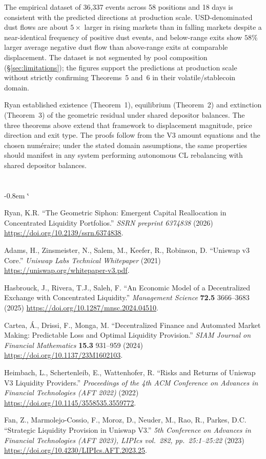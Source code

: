 \documentclass[11pt,a4paper]{article}
\makeatletter
\renewenvironment{thebibliography}[1]
  {\section*{\refname}%
   \fontsize{10pt}{12pt}\selectfont
   \list{\@biblabel{\@arabic\c@enumiv}}%
        {\settowidth\labelwidth{\@biblabel{#1}}%
         \leftmargin\labelwidth
         \advance\leftmargin-0.8em
         \advance\leftmargin\labelsep
         \setlength\itemindent{1em}%
         \setlength\itemsep{6pt plus 1pt minus 1pt}%
         \setlength\parsep{0pt}%
         \usecounter{enumiv}%
         \let\p@enumiv\@empty
         \renewcommand\theenumiv{\@arabic\c@enumiv}}%
   \sloppy\clubpenalty4000\widowpenalty4000\sfcode`\.\@m}
  {\def\@noitemerr{\@latex@warning{Empty `thebibliography' environment}}%
   \endlist}
\theoremstyle{definition}
\makeatother
\begin{document}
The empirical dataset of 36{,}337 events across 58 positions and 18 days is consistent with the predicted directions at production scale. USD-denominated dust flows are about $5\times$ larger in rising markets than in falling markets despite a near-identical frequency of positive dust events, and below-range exits show $58\%$ larger average negative dust flow than above-range exits at comparable displacement. The dataset is not segmented by pool composition (\S\ref{sec:limitations}); the figures support the predictions at production scale without strictly confirming Theorems~5 and~6 in their volatile/stablecoin domain.

Ryan\cite{ryan2026a} established existence (Theorem~1), equilibrium (Theorem~2) and extinction (Theorem~3) of the geometric residual under shared depositor balances. The three theorems above extend that framework to displacement magnitude, price direction and exit type. The proofs follow from the V3 amount equations and the chosen num\'eraire; under the stated domain assumptions, the same properties should manifest in any system performing autonomous CL rebalancing with shared depositor balances.

\pagestyle{plain}
\begin{thebibliography}{9}

Ryan, K.R. ``The Geometric Siphon: Emergent Capital Reallocation in Concentrated Liquidity Portfolios.'' \emph{SSRN preprint 6374838} (2026) \url{https://doi.org/10.2139/ssrn.6374838}.

Adams, H., Zinsmeister, N., Salem, M., Keefer, R., Robinson, D. ``Uniswap v3 Core.'' \emph{Uniswap Labs Technical Whitepaper} (2021) \url{https://uniswap.org/whitepaper-v3.pdf}.

Hasbrouck, J., Rivera, T.J., Saleh, F. ``An Economic Model of a Decentralized Exchange with Concentrated Liquidity.'' \emph{Management Science} \textbf{72.5} 3666--3683 (2025) \url{https://doi.org/10.1287/mnsc.2024.04510}.

Cartea, \'A., Drissi, F., Monga, M. ``Decentralized Finance and Automated Market Making: Predictable Loss and Optimal Liquidity Provision.'' \emph{SIAM Journal on Financial Mathematics} \textbf{15.3} 931--959 (2024) \url{https://doi.org/10.1137/23M1602103}.

Heimbach, L., Schertenleib, E., Wattenhofer, R. ``Risks and Returns of Uniswap V3 Liquidity Providers.'' \emph{Proceedings of the 4th ACM Conference on Advances in Financial Technologies (AFT 2022)} (2022) \url{https://doi.org/10.1145/3558535.3559772}.

Fan, Z., Marmolejo-Cossio, F., Moroz, D., Neuder, M., Rao, R., Parkes, D.C. ``Strategic Liquidity Provision in Uniswap V3.'' \emph{5th Conference on Advances in Financial Technologies (AFT 2023), LIPIcs vol.~282, pp.~25:1--25:22} (2023) \url{https://doi.org/10.4230/LIPIcs.AFT.2023.25}.

\end{thebibliography}
\end{document}
